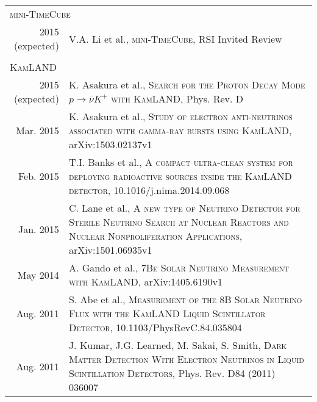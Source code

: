 \documentclass[a4paper,10pt]{article} %
\begin{document}
\begin{tabular}{rp{11cm}}
	\multicolumn{2}{l}{\textsc{mini-TimeCube}} \\
	2015 (expected) & V.A. Li et al., \textsc{mini-TimeCube}, RSI Invited Review\\
	\multicolumn{2}{c}{} \\
	\multicolumn{2}{l}{\textsc{KamLAND}} \\
	2015 (expected) & K. Asakura et al., \textsc{Search for the Proton Decay
Mode $p \rightarrow \overline{\nu} K^{+}$ with KamLAND}, Phys. Rev. D\\
	Mar. 2015 & K. Asakura et al., \textsc{Study of electron anti-neutrinos
	associated with gamma-ray bursts using KamLAND}, arXiv:1503.02137v1\\
	Feb. 2015 & T.I. Banks et al., \textsc{A compact ultra-clean system for
	deploying radioactive sources inside the KamLAND detector},
	10.1016/j.nima.2014.09.068\\
	Jan. 2015 & C. Lane et al., \textsc{A new type of Neutrino Detector for
	Sterile Neutrino Search at Nuclear Reactors and Nuclear Nonproliferation
	Applications}, arXiv:1501.06935v1\\
	May 2014 & A. Gando et al., \textsc{7Be Solar Neutrino Measurement with
	KamLAND}, arXiv:1405.6190v1\\
	Aug. 2011 & S. Abe et al., \textsc{Measurement of the 8B Solar Neutrino
	Flux with the KamLAND Liquid Scintillator Detector},
	10.1103/PhysRevC.84.035804\\
	Aug. 2011 & J. Kumar, J.G. Learned, M. Sakai, S. Smith,
	\textsc{Dark Matter Detection With Electron Neutrinos in Liquid
	Scintillation Detectors}, Phys. Rev. D84 (2011) 036007\\
\end{tabular}

\end{document}
